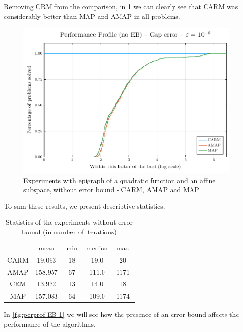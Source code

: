 \documentclass[smallextended,numbook,nospthms]{svjour3}
\theoremstyle{plain}
\theoremstyle{definition}
\begin{document}
Removing CRM from the comparison, in \cref{fig:perprof no EB 2} we can clearly see that CARM was considerably better than MAP and AMAP in all problems.
\begin{figure}[h!]
	\centering
	\includegraphics[scale=0.8]{fig2}
	\caption{Experiments with epigraph of a quadratic function and an affine subspace, without error bound - CARM, AMAP and MAP}
	\label{fig:perprof no EB 2}
\end{figure}

To sum these results, we present descriptive statistics.
\begin{table}[h!]
\centering
\begin{tabular}{ccccc}
	\hline & mean & $\min$ & median & $\max$ \\
	\cline { 2 - 5 } CARM & 19.093 & 18 & 19.0 & 20 \\
	AMAP & 158.957 & 67 & 111.0 & 1171 \\
	CRM & 13.932 & 13 & 14.0 & 18 \\
	MAP & 157.083 & 64 & 109.0 & 1174 \\
	\hline
\end{tabular}
	\caption{Statistics of the experiments without error bound (in number of iterations)}
	\label{table:perprof no EB}
\end{table}

In \cref{fig:perprof EB 1} we will see how the presence of an error bound affects the performance of the algorithms.
\end{document}
